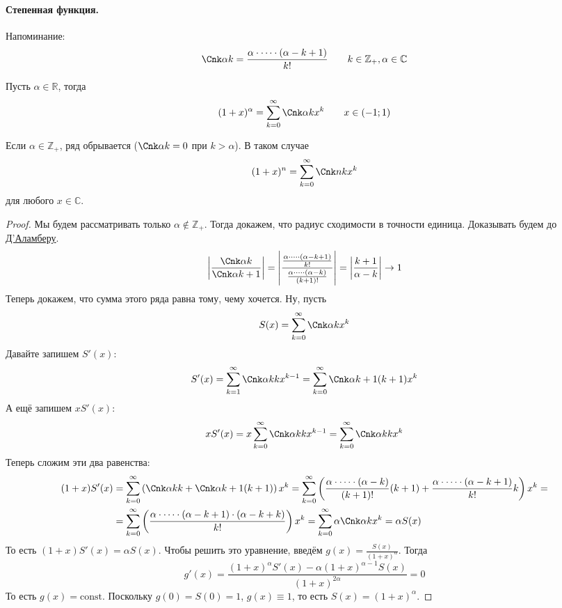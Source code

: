 \documentclass{article}
\begin{document}
    \paragraph{Степенная функция.}
    \begin{remark}
        Напоминание:
        $$
        \Cnk\alpha k=\frac{\alpha\cdot\cdots\cdot(\alpha-k+1)}{k!}\qquad k\in\mathbb Z_+,\alpha\in\mathbb C
        $$
    \end{remark}
    \begin{theorem}
        Пусть $\alpha\in\mathbb R$, тогда
        $$
        (1+x)^\alpha=\sum\limits_{k=0}^\infty\Cnk\alpha kx^k\qquad x\in(-1;1)
        $$
    \end{theorem}
    \begin{remark}
        Если $\alpha\in\mathbb Z_+$, ряд обрывается ($\Cnk\alpha k=0$ при $k>\alpha$). В таком случае
        $$
        (1+x)^n=\sum\limits_{k=0}^\infty \Cnk nk x^k
        $$
        для любого $x\in\mathbb C$.
    \end{remark}
    \begin{proof}
        Мы будем рассматривать только $\alpha\notin\mathbb Z_+$. Тогда докажем, что радиус сходимости в точности единица. Доказывать будем до \hyperref[Радиус сходимости по Д'Аламберу]{Д'Аламберу}.
        $$
        \left|\frac{\Cnk\alpha k}{\Cnk\alpha{k+1}}\right|=\left|\frac{\frac{\alpha\cdot\cdots\cdot(\alpha-k+1)}{k!}}{\frac{\alpha\cdot\cdots\cdot(\alpha-k)}{(k+1)!}}\right|=\left|\frac{k+1}{\alpha-k}\right|\rightarrow1
        $$
        Теперь докажем, что сумма этого ряда равна тому, чему хочется. Ну, пусть
        $$
        S(x)=\sum\limits_{k=0}^\infty\Cnk\alpha kx^k
        $$
        Давайте запишем $S'(x)$:
        $$
            S'(x)=\sum\limits_{k=1}^\infty\Cnk\alpha kkx^{k-1}=\sum\limits_{k=0}^\infty\Cnk\alpha{k+1}(k+1)x^k
        $$
        А ещё запишем $xS'(x)$:
        $$
        xS'(x)=x\sum\limits_{k=0}^\infty\Cnk\alpha kkx^{k-1}=\sum\limits_{k=0}^\infty\Cnk\alpha kkx^k
        $$
        Теперь сложим эти два равенства:
        \[\begin{split}
            (1+x)S'(x)&=\sum\limits_{k=0}^\infty\left(\Cnk\alpha kk+\Cnk\alpha{k+1}(k+1)\right)x^k=\sum\limits_{k=0}^\infty\left(\frac{\alpha\cdot\cdots\cdot(\alpha-k)}{(k+1)!}(k+1)+\frac{\alpha\cdot\cdots\cdot(\alpha-k+1)}{k!}k\right)x^k=\\
            &=\sum\limits_{k=0}^\infty\left(\frac{\alpha\cdot\cdots\cdot(\alpha-k+1)\cdot(\alpha-k+k)}{k!}\right)x^k=\sum\limits_{k=0}^\infty\alpha\Cnk\alpha kx^k=\alpha S(x)
        \end{split}\]
        То есть $(1+x)S'(x)=\alpha S(x)$. Чтобы решить это уравнение, введём $g(x)=\frac{S(x)}{(1+x)^\alpha}$. Тогда
        $$
        g'(x)=\frac{(1+x)^\alpha S'(x)-\alpha(1+x)^{\alpha-1}S(x)}{(1+x)^{2\alpha}}=0
        $$
        То есть $g(x)=\mathrm{const}$. Поскольку $g(0)=S(0)=1$, $g(x)\equiv1$, то есть $S(x)=(1+x)^\alpha$.
    \end{proof}
\end{document}
